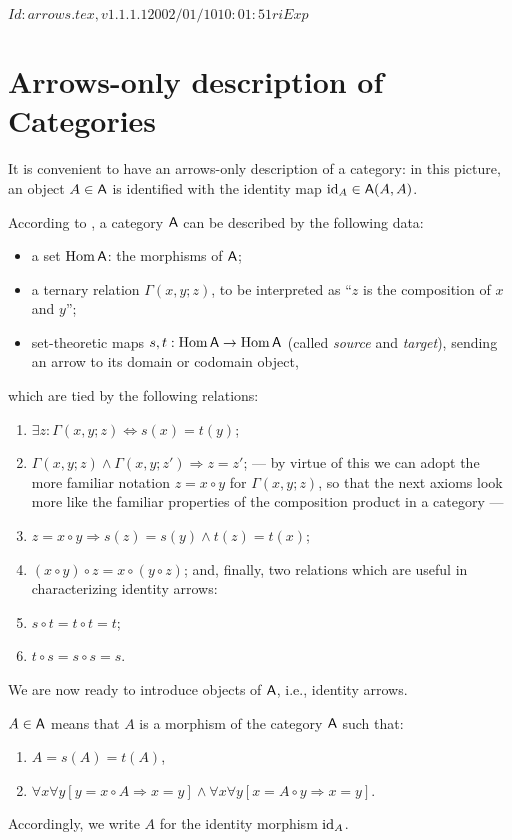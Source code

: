 \RCSID $Id: arrows.tex,v 1.1.1.1 2002/01/10 10:01:51 ri Exp $


\chapter{Arrows-only description of Categories}
\label{cha:arrows-only}

It is convenient to have an arrows-only description of a category: in
this picture, an object $A \in \mathsf{A}$ is identified with the identity map
$\operatorname{id}_A \in \mathsf{A}(A, A)$.

According to \cite{lawvere;1965}, a category $\mathsf{A}$ can be described by
the following data:
\begin{itemize}
\item a set $\operatorname{Hom}\mathsf{A}$: the morphisms of $\mathsf{A}$;
\item a ternary relation $\Gamma(x,y;z)$, to be interpreted as ``$z$ is
  the composition of $x$ and $y$'';
\item set-theoretic maps $s,t: \operatorname{Hom}\mathsf{A} \to \operatorname{Hom}\mathsf{A}$ (called \emph{source}
  and \emph{target}), sending an arrow to its domain or codomain
  object,
\end{itemize}
which are tied by the following relations:
\begin{enumerate}
\item $\exists z: \Gamma(x,y;z) \Leftrightarrow s(x) = t(y)$; \label{item:A1}
\item $\Gamma(x,y;z) \land \Gamma(x,y;z') \Rightarrow z = z'$;
--- by virtue of this we can adopt the more familiar notation $z = x\circ
y$ for $\Gamma(x,y; z)$, so that the next axioms look more like the
familiar properties of the composition product in a category ---
\item $z = x\circ y \Rightarrow s(z) = s(y) \land t(z) = t(x)$;
\item $(x\circ y) \circ z = x \circ (y \circ z)$;
and, finally, two relations which are useful in characterizing
identity arrows:
\item $s \circ t = t \circ t = t$;
\item $t \circ s = s \circ s = s$.
\end{enumerate}

We are now ready to introduce objects of $\mathsf{A}$, i.e., identity
arrows. 
\begin{definition}\label{dfn:object}
  $A\in \mathsf{A}$ means that $A$ is a morphism of the category $\mathsf{A}$
  such that:
  \begin{enumerate}
  \item $A = s(A) = t(A)$, \label{item:AO1}
  \item $\forall x\forall y[ y = x \circ A \Rightarrow x = y] \land \forall x\forall y [
    x = A \circ y \Rightarrow x = y]$. \label{item:AO2} 
  \end{enumerate}
\end{definition}
Accordingly, we write $A$ for the identity morphism $\operatorname{id}_A$.


